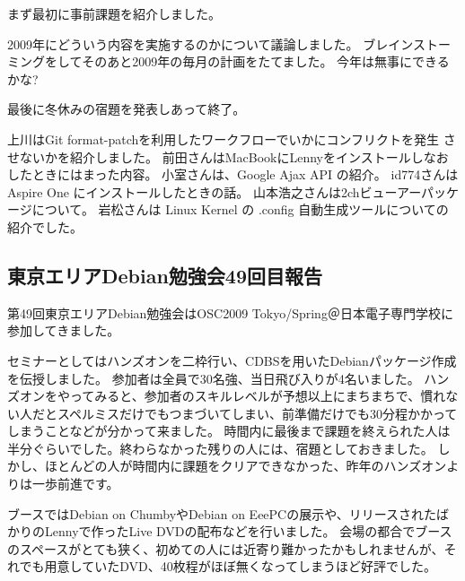 \documentclass[mingoth,a4paper]{jsarticle}
\begin{document}
まず最初に事前課題を紹介しました。

2009年にどういう内容を実施するのかについて議論しました。
ブレインストーミングをしてそのあと2009年の毎月の計画をたてました。
今年は無事にできるかな?

最後に冬休みの宿題を発表しあって終了。

上川はGit format-patchを利用したワークフローでいかにコンフリクトを発生
させないかを紹介しました。
前田さんはMacBookにLennyをインストールしなおしたときにはまった内容。
小室さんは、Google Ajax API の紹介。
id774さんはAspire One にインストールしたときの話。
山本浩之さんは2chビューアーパッケージについて。
岩松さんは Linux Kernel の .config 自動生成ツールについての紹介でした。

\subsection{東京エリアDebian勉強会49回目報告}

第49回東京エリアDebian勉強会はOSC2009 Tokyo/Spring＠日本電子専門学校に参加してきました。

セミナーとしてはハンズオンを二枠行い、CDBSを用いたDebianパッケージ作成を伝授しました。
参加者は全員で30名強、当日飛び入りが4名いました。
ハンズオンをやってみると、参加者のスキルレベルが予想以上にまちまちで、慣れない人だとスペルミスだけでもつまづいてしまい、前準備だけでも30分程かかってしまうことなどが分かって来ました。
時間内に最後まで課題を終えられた人は半分ぐらいでした。終わらなかった残りの人には、宿題としておきました。
しかし、ほとんどの人が時間内に課題をクリアできなかった、昨年のハンズオンよりは一歩前進です。

ブースではDebian on ChumbyやDebian on EeePCの展示や、リリースされたばかりのLennyで作ったLive DVDの配布などを行いました。
会場の都合でブースのスペースがとても狭く、初めての人には近寄り難かったかもしれませんが、それでも用意していたDVD、40枚程がほぼ無くなってしまうほど好評でした。

%
%
%
\end{document}
